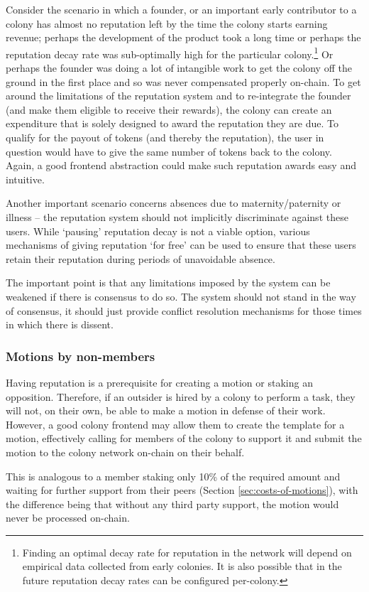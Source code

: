 Consider the scenario in which a founder, or an important early contributor to a colony has almost no reputation left by the time the colony starts earning revenue; perhaps the development of the product took a long time or perhaps the reputation decay rate was sub-optimally high for the particular colony.\footnote{Finding an optimal decay rate for reputation in the network will depend on empirical data collected from early colonies. It is also possible that in the future reputation decay rates can be configured per-colony.} Or perhaps the founder was doing a lot of intangible work to get the colony off the ground in the first place and so was never compensated properly on-chain. To get around the limitations of the reputation system and to re-integrate the founder (and make them eligible to receive their rewards), the colony can create an expenditure that is solely designed to award the reputation they are due. To qualify for the payout of tokens (and thereby the reputation), the user in question would have to give the same number of tokens back to the colony. Again, a good frontend abstraction could make such reputation awards easy and intuitive.

Another important scenario concerns absences due to maternity/paternity or illness -- the reputation system should not implicitly discriminate against these users. While `pausing' reputation decay is not a viable option, various mechanisms of giving reputation `for free' can be used to ensure that these users retain their reputation during periods of unavoidable absence.

The important point is that any limitations imposed by the system can be weakened if there is consensus to do so. The system should not stand in the way of consensus, it should just provide conflict resolution mechanisms for those times in which there is dissent.

\subsubsection{Motions by non-members}

Having reputation is a prerequisite for creating a motion or staking an opposition. Therefore, if an outsider is hired by a colony to perform a task, they will not, on their own, be able to make a motion in defense of their work. However, a good colony frontend may allow them to create the template for a motion, effectively calling for members of the colony to support it and submit the motion to the colony network on-chain on their behalf.

This is analogous to a member staking only 10\% of the required amount and waiting for further support from their peers (Section \ref{sec:costs-of-motions}), with the difference being that without any third party support, the motion would never be processed on-chain.
